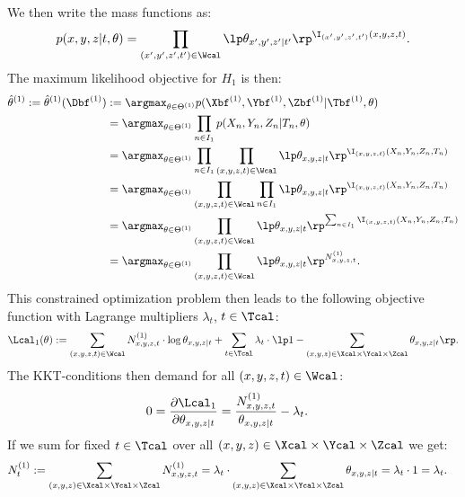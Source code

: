 We then write the mass functions as:
\[ p(x,y,z|t,\theta) = \prod_{(x',y',z',t')\in \Wcal} \lp \theta_{x',y',z'|t'} \rp^{\I_{(x',y',z',t')}(x,y,z,t)}.\]
The maximum likelihood objective for $H_1$ is then:
\begin{align*} \hat \theta^{(1)} := \hat \theta^{(1)}(\Dbf^{(1)}) 
&:= \argmax_{\theta \in\Theta^{(1)}} p(\Xbf^{(1)},\Ybf^{(1)},\Zbf^{(1)}|\Tbf^{(1)},\theta) \\
&= \argmax_{\theta \in\Theta^{(1)}} \prod_{n \in I_1}  p(X_n,Y_n,Z_n|T_n,\theta) \\
&= \argmax_{\theta \in\Theta^{(1)}} \prod_{n \in I_1} \prod_{(x,y,z,t)\in \Wcal} \lp \theta_{x,y,z|t} \rp^{\I_{(x,y,z,t)}(X_n,Y_n,Z_n,T_n)} \\
&= \argmax_{\theta \in\Theta^{(1)}} \prod_{(x,y,z,t)\in \Wcal} \prod_{n \in I_1} \lp \theta_{x,y,z|t} \rp^{\I_{(x,y,z,t)}(X_n,Y_n,Z_n,T_n)} \\
&= \argmax_{\theta \in\Theta^{(1)}} \prod_{(x,y,z,t)\in \Wcal} \lp \theta_{x,y,z|t} \rp^{\sum_{n \in I_1} \I_{(x,y,z,t)}(X_n,Y_n,Z_n,T_n)} \\
&= \argmax_{\theta \in\Theta^{(1)}} \prod_{(x,y,z,t)\in \Wcal} \lp \theta_{x,y,z|t} \rp^{ N_{x,y,z,t}^{(1)}}.%
\end{align*}
This constrained optimization problem then leads to the following objective function with Lagrange multipliers $\lambda_t$, $t \in \Tcal$:
\[ \Lcal_1(\theta) := \sum_{(x,y,z,t)\in \Wcal} N_{x,y,z,t}^{(1)} \cdot \log \theta_{x,y,z|t} + 
\sum_{t \in \Tcal} \lambda_{t} \cdot \lp 1- \sum_{(x,y,z) \in\Xcal\times\Ycal\times\Zcal} \theta_{x,y,z|t}\rp.   \]
The KKT-conditions then demand for all $(x,y,z,t) \in \Wcal$:
\begin{align*}
    0= \frac{\partial \Lcal_1}{\partial\theta_{x,y,z|t}} &= \frac{N_{x,y,z,t}^{(1)}}{\theta_{x,y,z|t}}  - \lambda_t.
\end{align*}
If we sum for fixed $t \in \Tcal$ over all $(x,y,z) \in \Xcal\times\Ycal\times\Zcal$ we get:
\begin{align*}
    N_{t}^{(1)} &:= \sum_{(x,y,z) \in \Xcal\times\Ycal\times\Zcal} N_{x,y,z,t}^{(1)} 
        =  \lambda_t \cdot \sum_{(x,y,z) \in \Xcal\times\Ycal\times\Zcal} \theta_{x,y,z|t} 
        = \lambda_t \cdot 1
        =\lambda_t.
\end{align*}
